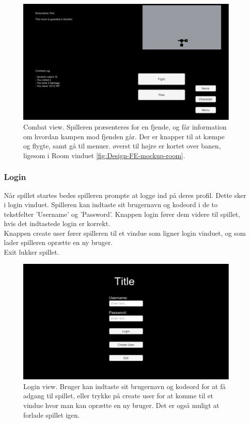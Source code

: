 \begin{figure}[h]
\centering
\includegraphics[width = \textwidth]{02-Body/Images/CombatMockup.PNG}
\caption{Combat view. Spilleren præsenteres for en fjende, og får information om hvordan kampen mod fjenden går. Der er knapper til at kæmpe og flygte, samt gå til menuer. øverst til højre er kortet over banen, ligesom i Room vinduet \autoref{fig:Design-FE-mockup-room}.}
\label{fig:Design-FE-mockup-combat}
\end{figure}


\subsubsection{Login}

Når spillet startes bedes spilleren prompte at logge ind på deres profil. Dette sker i login vinduet. Spilleren kan indtaste sit brugernavn og kodeord i de to tekstfelter 'Username' og 'Password'. Knappen login fører dem videre til spillet, hvis det indtastede login er korrekt.\\
Knappen create user fører spilleren til et vindue som ligner login vinduet, og som lader spilleren oprætte en ny bruger.\\
Exit lukker spillet.

\begin{figure}[h]
\centering
\includegraphics[width = \textwidth]{02-Body/Images/LoginMockup.PNG}
\caption{Login view. Bruger kan indtaste sit brugernavn og kodeord for at få adgang til spillet, eller trykke på create user for at komme til et vindue hvor man kan oprætte en ny bruger. Det er også muligt at forlade spillet igen.}
\label{fig:Design-FE-mockup-login}
\end{figure}


